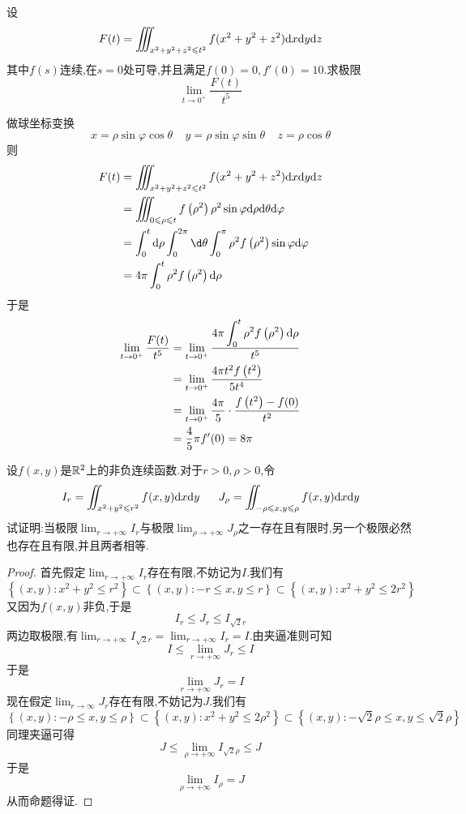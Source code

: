 \documentclass{ctexart}
\begin{document}
\begin{problem}[6.(10\songti{分})]
    设
    \[F(t)=\iiint_{x^2+y^2+z^2\leqslant t^2}f(x^2+y^2+z^2)\mathrm{d} x\mathrm{d} y\mathrm{d} z\]
    其中$f(s)$连续,在$s=0$处可导,并且满足$f(0)=0,f'(0)=10$.求极限
    \[\lim_{t\to0^+}\dfrac{F(t)}{t^5}\]

\end{problem}
\begin{solution}
    做球坐标变换
    \[x=\rho\sin\varphi\cos\theta\ \ \ \ \ y=\rho\sin\varphi\sin\theta\ \ \ \ \ z=\rho\cos\theta\]
    则
    \[\begin{aligned}
        F(t)
        &= \iiint_{x^2+y^2+z^2\leqslant t^2}f(x^2+y^2+z^2)\dx\di y\di z \\
        &= \iiint_{0\leqslant\rho\leqslant t}f\left(\rho^2\right)\rho^2\sin\varphi\di\rho\di\theta\di\varphi \\
        &= \int_0^t\di\rho\int_0^{2\pi}\d\theta\int_0^{\pi}\rho^2f\left(\rho^2\right)\sin\varphi\di\varphi \\
        &= 4\pi\int_0^{t}\rho^2f\left(\rho^2\right)\di\rho
    \end{aligned}\]
    于是
    \[\begin{aligned}
        \lim_{t\to0^+}\dfrac{F(t)}{t^5}
        &= \lim_{t\to0^+}\dfrac{\displaystyle4\pi\int_0^{t}\rho^2f\left(\rho^2\right)\mathrm{d}\rho}{t^5} \\
        &= \lim_{t\to0^+}\dfrac{4\pi t^2f\left(t^2\right)}{5t^4} \\
        &= \lim_{t\to0^+}\dfrac{4\pi}{5}\cdot\dfrac{f\left(t^2\right)-f(0)}{t^2} \\
        &= \dfrac45\pi f'(0)=8\pi
    \end{aligned}\]

\end{solution}
\begin{problem}[7.(10\songti{分})]
    设$f(x,y)$是$\mathbb{R}^2$上的非负连续函数.对于$r>0,\rho>0$,令
    \[I_r=\iint_{x^2+y^2\leqslant r^2}f(x,y)\mathrm{d} x\mathrm{d} y\ \ \ \ \ J_{\rho}=\iint_{-\rho\leqslant x,y\leqslant\rho}f(x,y)\mathrm{d} x\mathrm{d} y\]
    试证明:当极限$\displaystyle\lim_{r\to+\infty}I_r$与极限$\displaystyle\lim_{\rho\to+\infty}J_\rho$之一存在且有限时,另一个极限必然也存在且有限,并且两者相等.
\end{problem}
\begin{proof}
    首先假定$\displaystyle\lim_{r\to+\infty}I_r$存在有限,不妨记为$I$.我们有
    \[\left\{(x,y):x^2+y^2\leqslant r^2\right\}
    \subset\left\{(x,y):-r\leqslant x,y\leqslant r\right\}
    \subset\left\{(x,y):x^2+y^2\leqslant 2r^2\right\}\]
    又因为$f(x,y)$非负,于是
    \[I_r\leqslant J_r\leqslant I_{\sqrt{2}r}\]
    两边取极限,有$\displaystyle\lim_{r\to+\infty}I_{\sqrt2r}=\lim_{r\to+\infty}I_{r}=I$.由夹逼准则可知
    \[I\leqslant\lim_{r\to+\infty}J_r\leqslant I\]
    于是
    \[\lim_{r\to+\infty}J_r=I\]
    现在假定$\displaystyle\lim_{r\to\infty}J_r$存在有限,不妨记为$J$.我们有
    \[\left\{(x,y):-\rho\leqslant x,y\leqslant\rho\right\}
    \subset\left\{(x,y):x^2+y^2\leqslant 2\rho^2\right\}
    \subset\left\{(x,y):-\sqrt2\rho\leqslant x,y\leqslant\sqrt2\rho\right\}\]
    同理夹逼可得
    \[J\leqslant\lim_{\rho\to+\infty}I_{\sqrt2\rho}\leqslant J\]
    于是
    \[\lim_{\rho\to+\infty}I_{\rho}=J\]
    从而命题得证.
\end{proof}
\end{document}
